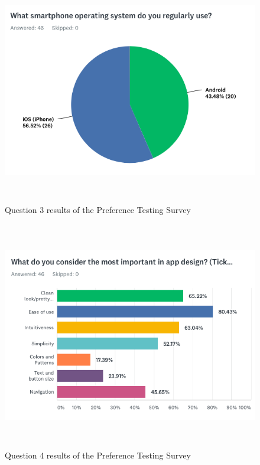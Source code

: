 \begin{figure}[H]
    \includegraphics[height=10cm, center]{figures/surveyresult3}
    \caption{Question 3 results of the Preference Testing Survey}
    \label{fig:surveyresult3}
\end{figure}
\begin{figure}[H]
    \includegraphics[height=10cm, center]{figures/surveyresult4}
    \caption{Question 4 results of the Preference Testing Survey}
    \label{fig:surveyresult4}
\end{figure}
